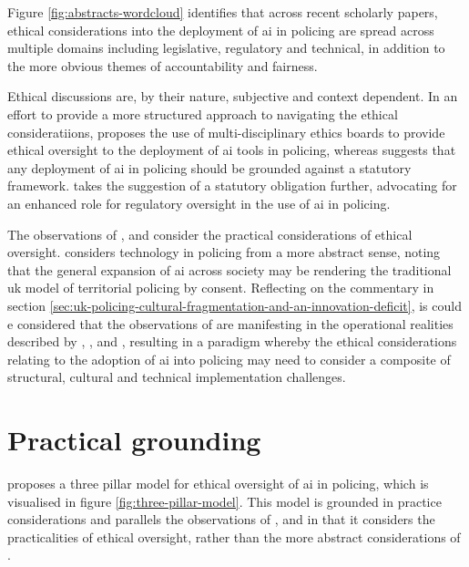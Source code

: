 \documentclass[12pt,a4paper,oneside]{report}
\begin{document}
Figure \ref{fig:abstracts-wordcloud} identifies that across recent scholarly papers, ethical considerations into the deployment of \gls{ai} in policing are spread across multiple domains including legislative, regulatory and technical, in addition to the more obvious themes of accountability and fairness.

Ethical discussions are, by their nature, subjective and context dependent.  In an effort to provide a more structured approach to navigating the ethical consideratiions, \citet{babuta2018machine} proposes the use of multi-disciplinary ethics boards to provide ethical oversight to the deployment of \gls{ai} tools in policing, whereas \citet{iryna2025implementation} suggests that any deployment of \gls{ai} in policing should be grounded against a statutory framework.  \citet{erdogan2024diving} takes the suggestion of a statutory obligation further, advocating for an enhanced role for regulatory oversight in the use of \gls{ai} in policing.  

The observations of \citet{babuta2018machine}, \citet{iryna2025implementation} and \citet{erdogan2024diving} consider the practical considerations of ethical oversight.  \citet{manning2020policing} considers technology in policing from a more abstract sense, noting that the general expansion of \gls{ai} across society may be rendering the traditional \gls{uk} model of territorial policing by consent.  Reflecting on the commentary in section \ref{sec:uk-policing-cultural-fragmentation-and-an-innovation-deficit}, is could e considered that the observations of \citet{manning2020policing} are manifesting in the operational realities described by \citet{casey2025gbcse}, \citet{homeoffice2024reform}, \citet{laufs2022technological} and \citet{ng2025ronin}, resulting in a paradigm whereby the ethical considerations relating to the adoption of \gls{ai} into policing may need to consider a composite of structural, cultural and technical implementation challenges.

\section{Practical grounding}
\label{sec:practical-grounding}
\citet{oswald2021threepillar} proposes a three pillar model for ethical oversight of \gls{ai} in policing, which is visualised in figure \ref{fig:three-pillar-model}.  This model is grounded in practice considerations and parallels the observations of \citet{babuta2018machine}, \citet{iryna2025implementation} and \citet{erdogan2024diving} in that it considers the practicalities of ethical oversight, rather than the more abstract considerations of \citet{manning2020policing}.
\end{document}
